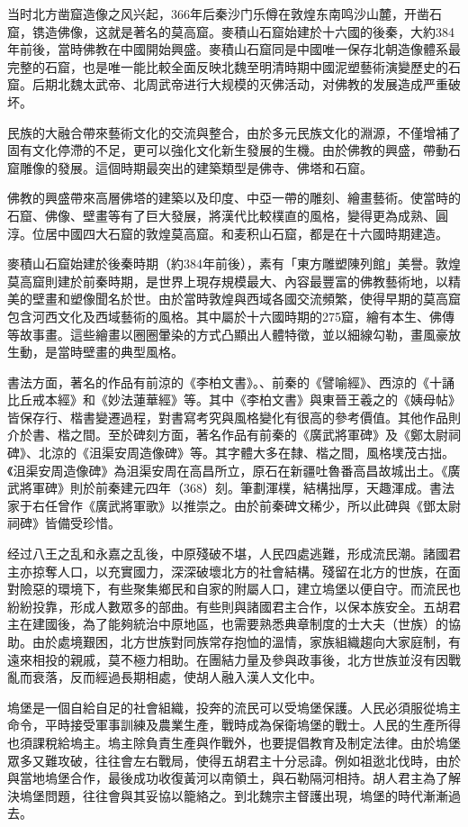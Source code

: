 当时北方凿窟造像之风兴起，366年后秦沙门乐僔在敦煌东南鸣沙山麓，开凿石窟，镌造佛像，这就是著名的莫高窟。麥積山石窟始建於十六國的後秦，大約384年前後，當時佛教在中國開始興盛。麥積山石窟同是中國唯一保存北朝造像體系最完整的石窟，也是唯一能比較全面反映北魏至明清時期中國泥塑藝術演變歷史的石窟。后期北魏太武帝、北周武帝进行大规模的灭佛活动，对佛教的发展造成严重破坏。

民族的大融合帶來藝術文化的交流與整合，由於多元民族文化的淵源，不僅增補了固有文化停滯的不足，更可以強化文化新生發展的生機。由於佛教的興盛，帶動石窟雕像的發展。這個時期最突出的建築類型是佛寺、佛塔和石窟。

佛教的興盛帶來高層佛塔的建築以及印度、中亞一帶的雕刻、繪畫藝術。使當時的石窟、佛像、壁畫等有了巨大發展，將漢代比較樸直的風格，變得更為成熟、圓淳。位居中國四大石窟的敦煌莫高窟。和麦积山石窟，都是在十六國時期建造。

麥積山石窟始建於後秦時期（約384年前後），素有「東方雕塑陳列館」美譽。敦煌莫高窟則建於前秦時期，是世界上現存規模最大、內容最豐富的佛教藝術地，以精美的壁畫和塑像聞名於世。由於當時敦煌與西域各國交流頻繁，使得早期的莫高窟包含河西文化及西域藝術的風格。其中屬於十六國時期的275窟，繪有本生、佛傳等故事畫。這些繪畫以圈圈暈染的方式凸顯出人體特徵，並以細線勾勒，畫風豪放生動，是當時壁畫的典型風格。

書法方面，著名的作品有前涼的《李柏文書》。、前秦的《譬喻經》、西涼的《十誦比丘戒本經》和《妙法蓮華經》等。其中《李柏文書》與東晉王羲之的《姨母帖》皆保存行、楷書變遷過程，對書寫考究與風格變化有很高的參考價值。其他作品則介於書、楷之間。至於碑刻方面，著名作品有前秦的《廣武將軍碑》及《鄭太尉祠碑》、北涼的《沮渠安周造像碑》等。其字體大多在隸、楷之間，風格墣茂古拙。《沮渠安周造像碑》為沮渠安周在高昌所立，原石在新疆吐魯番高昌故城出土。《廣武將軍碑》則於前秦建元四年（368）刻。筆劃渾樸，結構拙厚，天趣渾成。書法家于右任曾作《廣武將軍歌》以推崇之。由於前秦碑文稀少，所以此碑與《鄧太尉祠碑》皆備受珍惜。

经过八王之乱和永嘉之乱後，中原殘破不堪，人民四處逃難，形成流民潮。諸國君主亦掠奪人口，以充實國力，深深破壞北方的社會結構。殘留在北方的世族，在面對險惡的環境下，有些聚集鄉民和自家的附屬人口，建立塢堡以便自守。而流民也紛紛投靠，形成人數眾多的部曲。有些則與諸國君主合作，以保本族安全。五胡君主在建國後，為了能夠統治中原地區，也需要熟悉典章制度的士大夫（世族）的協助。由於處境艱困，北方世族對同族常存抱恤的溫情，家族組織趨向大家庭制，有遠來相投的親戚，莫不極力相助。在團結力量及參與政事後，北方世族並沒有因戰亂而衰落，反而經過長期相處，使胡人融入漢人文化中。

塢堡是一個自給自足的社會組織，投奔的流民可以受塢堡保護。人民必須服從塢主命令，平時接受軍事訓練及農業生產，戰時成為保衛塢堡的戰士。人民的生產所得也須課稅給塢主。塢主除負責生產與作戰外，也要提倡教育及制定法律。由於塢堡眾多又難攻破，往往會左右戰局，使得五胡君主十分忌諱。例如祖逖北伐時，由於與當地塢堡合作，最後成功收復黃河以南領土，與石勒隔河相持。胡人君主為了解決塢堡問題，往往會與其妥協以籠絡之。到北魏宗主督護出現，塢堡的時代漸漸過去。


